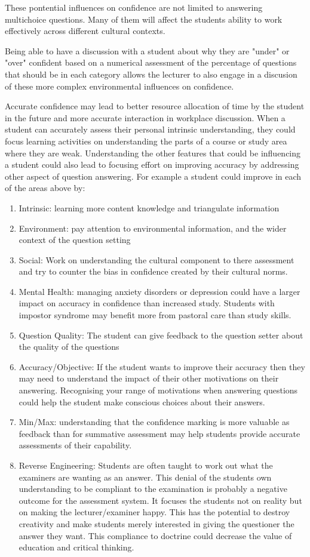 \documentclass[sigconf]{acmart}
\begin{document}
These pontential influences on confidence are not limited to answering multichoice questions.  Many of them will affect the students ability to work effectively across different cultural contexts.

Being able to have a discussion with a student about why they are "under" or "over" confident based on a numerical assessment of the percentage of questions that should be in each category allows the lecturer to also engage in a discusion of these more complex environmental influences on confidence.

Accurate confidence may lead to better resource allocation of time by the student in the future and more accurate interaction in workplace discussion. When a student can accurately assess their personal intrinsic understanding, they could focus learning activities on understanding the parts of a course or study area where they are weak. Understanding the other features that could be influencing a student could also lead to focusing effort on improving accuracy by addressing other aspect of question answering.
For example a student could improve in each of the areas above by:
\begin{enumerate}
    \item Intrinsic: learning more content knowledge and triangulate information
    \item Environment: pay attention to environmental information, and the wider context of the question setting
    \item Social: Work on understanding the cultural component to there assessment and try to counter the bias in confidence created by their cultural norms.
    \item Mental Health: managing anxiety disorders or depression could have a larger impact on accuracy in confidence than increased study.  Students with impostor syndrome may benefit more from pastoral care than study skills.
    \item Question Quality: The student can give feedback to the question setter about the quality of the questions
    \item Accuracy/Objective:  If the student wants to improve their accuracy then they may need to understand the impact of their other motivations on their answering.  Recognising your range of motivations when answering questions could help the student make conscious choices about their answers.
    \item Min/Max: understanding that the confidence marking is more valuable as feedback than for summative assessment may help students provide accurate assessments of their capability.
    \item Reverse Engineering: Students are often taught to work out what the examiners are wanting as an answer.  This denial of the students own understanding to be compliant to the examination is probably a negative outcome for the assessment system.  It focuses the students not on reality but on making the lecturer/examiner happy.  This has the potential to destroy creativity and make students merely interested in giving the questioner the answer they want. This compliance to doctrine could decrease the value of education and critical thinking.
\end{enumerate}
\end{document}
